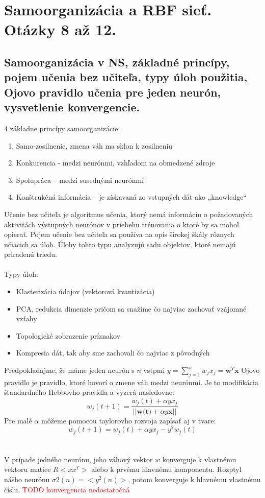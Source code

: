 \documentclass{article}
\numberwithin{equation}{section} %
\begin{document}
\section{Samoorganizácia a RBF sieť. Otázky 8 až 12.}
\subsection{Samoorganizácia v NS, základné princípy, pojem učenia bez učiteľa, typy úloh použitia, Ojovo pravidlo učenia pre jeden neurón, vysvetlenie konvergencie.}

4 základne princípy samoorganizácie:
\begin{enumerate}
\item Samo-zosilnenie,  zmena váh ma sklon k zosilneniu
\item Konkurencia - medzi neurónmi, vzhľadom na obmedzené zdroje
\item Spolupráca – medzi susednými neurónmi
\item Konštrukčná informácia – je získavaná zo vstupných dát ako „knowledge“
\end{enumerate}
Učenie bez učiteľa je algoritmus učenia, ktorý nemá informáciu o požadovaných aktivitách výstupných neurónov v priebehu trénovania o ktoré by sa mohol opierať. Pojem učenie bez učiteľa sa používa na opis širokej škály rôznych učiacich sa úloh. Úlohy tohto typu analyzujú sadu objektov, ktoré nemajú priradenú triedu.
\\\\
Typy úloh:
\begin{itemize}
\item Klasterizácia údajov (vektorová kvantizácia)
\item PCA, redukcia dimenzie pričom sa snažíme čo najviac zachovať vzájomné vzťahy
\item Topologické zobrazenie príznakov
\item Kompresia dát, tak aby sme zachovali čo najviac z pôvodných
\end{itemize}
Predpokladajme, že máme jeden neurón s $n$ vstpmi $y = \sum_{j=1}^n w_jx_j = \textbf{w}^T\textbf{x}$
Ojovo pravidlo je pravidlo, ktoré hovorí o zmene váh medzi neurónmi. Je to modifikácia štandardného Hebbovho pravidla a vyzerá nasledovne:
$$w_j(t+1) = \frac{w_j(t) + \alpha yx_j}{||\textbf{w(t)} + \alpha y\textbf{x}||}$$
Pre malé $\alpha$ môžeme pomocou taylorovho rozvoja zapísať aj v tvare:
$$w_j(t+1)= w_j(t)+\alpha yx_j - y^2w_j(t)$$
\\\\
V prípade jedného neurónu, jeho váhový vektor $w$ konverguje k vlastnému vektoru matice $R<xx^T>$ alebo k prvému hlavnému komponentu. Rozptyl nášho neurónu $\sigma2(n) = <y^2(n)>$, potom konverguje k hlavnému vlastnému číslu.
\textcolor{red}{TODO konvergencia nedostatočná}
\end{document}
